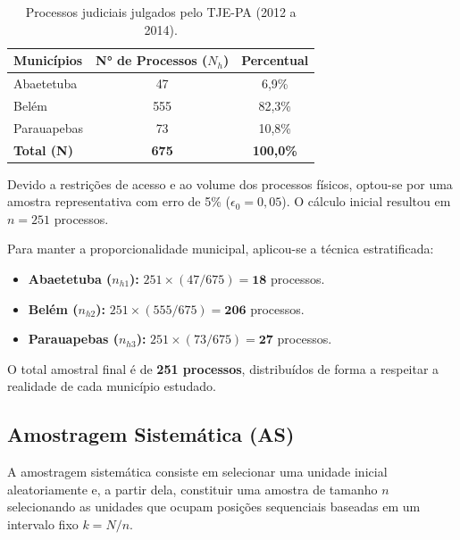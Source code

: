\begin{table}[!htb]
    \centering
    \caption{Processos judiciais julgados pelo TJE-PA (2012 a 2014).}
    \label{tab:processos_para}
    \vspace{0.2cm}
    \begin{tabular}{l|c|c}
    \hline\hline
        \textbf{Municípios} & \textbf{N° de Processos ($N_h$)} & \textbf{Percentual} \\
    \hline\hline
    Abaetetuba   & 47   & 6,9\%   \\
    Belém        & 555  & 82,3\%  \\
    Parauapebas  & 73   & 10,8\%  \\
    \hline
    \textbf{Total (N)} & \textbf{675} & \textbf{100,0\%} \\
    \hline\hline
    \end{tabular}
\end{table}

Devido a restrições de acesso e ao volume dos processos físicos, optou-se por uma amostra representativa com erro de 5\% ($\epsilon_0 = 0,05$). O cálculo inicial resultou em $n = 251$ processos. \vskip0.3cm

Para manter a proporcionalidade municipal, aplicou-se a técnica estratificada: \vskip0.3cm

\begin{itemize}
    \item \textbf{Abaetetuba ($n_{h1}$):} $251 \times (47/675) = \mathbf{18}$ processos.
    \item \textbf{Belém ($n_{h2}$):} $251 \times (555/675) = \mathbf{206}$ processos.
    \item \textbf{Parauapebas ($n_{h3}$):} $251 \times (73/675) = \mathbf{27}$ processos.
\end{itemize}

O total amostral final é de \textbf{251 processos}, distribuídos de forma a respeitar a realidade de cada município estudado.




\newpage
\subsection{Amostragem Sistemática (AS)}

A amostragem sistemática consiste em selecionar uma unidade inicial aleatoriamente e, a partir dela, constituir uma amostra de tamanho $n$ selecionando as unidades que ocupam posições sequenciais baseadas em um intervalo fixo $k = N/n$. \vskip0.3cm

